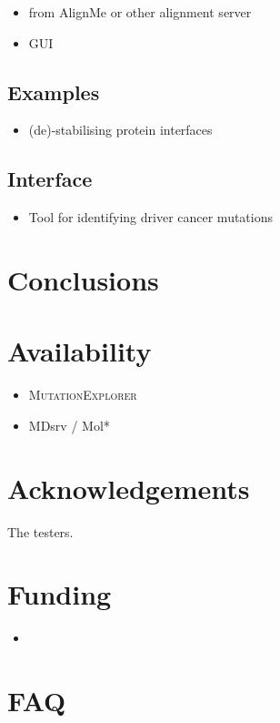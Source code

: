\documentclass[11pt]{article}
\newcommand{\ME}{\textsc{MutationExplorer}}
\begin{document}
\begin{itemize}
\item from AlignMe or other alignment server
\item GUI
\end{itemize}

\subsection*{Examples}

\begin{itemize}
\item (de)-stabilising protein interfaces
\end{itemize}


\subsection*{Interface}

\begin{itemize}
\item Tool for identifying driver cancer mutations
\end{itemize}


\section*{Conclusions}

\section*{Availability}
\begin{itemize}
\item \ME
\item MDsrv / Mol*
\end{itemize}

\section*{Acknowledgements}
The testers.

\section*{Funding}

\begin{itemize}
\item 
\end{itemize}

\clearpage

\section*{FAQ}
\end{document}
